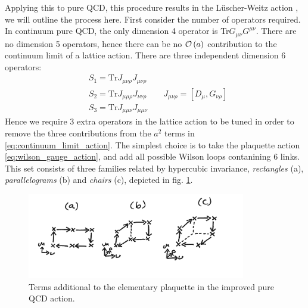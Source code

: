 Applying this to pure QCD, this procedure results in the L\"uscher-Weitz action \cite{luscher1985}, we will outline the process here. First consider the number of operators required. In continuum pure QCD, the only dimension 4 operator is Tr$G_{\mu\nu}G^{\mu\nu}$. There are no dimension 5 operators, hence there can be no $\mathcal{O}\left( a \right)$ contribution to the continuum limit of a lattice action. There are three independent dimension 6 operators:
\begin{align}
  \nonumber
  &S_1 = \text{Tr} J_{\mu\nu\rho} J_{\mu\nu\rho} \\
  \nonumber
  &S_2 = \text{Tr} J_{\mu\mu\rho} J_{\nu\nu\rho} \quad\quad J_{\mu\nu\rho} = [ D_{\mu}, G_{\nu\rho} ] \\
  &S_3 = \text{Tr} J_{\mu\mu\nu} J_{\mu\mu\nu}
\end{align}
Hence we require 3 extra operators in the lattice action to be tuned in order to remove the three contributions from the $a^2$ terms in \eqref{eq:continuum_limit_action}. The simplest choice is to take the plaquette action \eqref{eq:wilson_gauge_action}, and add all possible Wilson loops contanining 6 links. This set consists of three families related by hypercubic invariance, {\it{rectangles}} (a), {\it{parallelograms}} (b) and {\it{chairs}} (c), depicted in fig. \ref{fig:LuscherWeitz}.

\begin{figure}
  \begin{center}
    \vspace{-10pt}
    \includegraphics[width=0.85\textwidth]{images/LuscherWeitz.jpg}
    \vspace{-10pt}
    \caption{Terms additional to the elementary plaquette in the improved pure QCD action. \label{fig:LuscherWeitz}}
    \vspace{-10pt}
  \end{center}
\end{figure}

